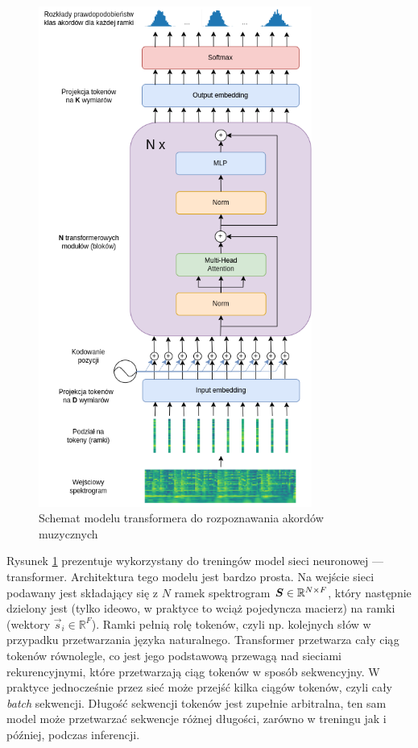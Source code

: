 \begin{figure}
    \centering
    \includegraphics[width=0.8\textwidth]{./images/transformer.png}
    \caption{Schemat modelu transformera do rozpoznawania akordów muzycznych}
    \label{fig:transformer}
\end{figure}

Rysunek \ref{fig:transformer} prezentuje wykorzystany do treningów model sieci neuronowej ---
transformer. Architektura tego modelu jest bardzo prosta. Na wejście sieci podawany jest składający
się z $N$ ramek spektrogram $\boldsymbol{S} \in \mathbb{R}^{N \times F}$, który następnie dzielony jest (tylko ideowo, w
praktyce to wciąż pojedyncza macierz) na ramki (wektory $\vec s_i \in \mathbb{R}^F$). Ramki pełnią
rolę tokenów, czyli np. kolejnych słów w przypadku przetwarzania języka naturalnego. Transformer
przetwarza cały ciąg tokenów równolegle, co jest jego podstawową przewagą nad sieciami
rekurencyjnymi, które przetwarzają ciąg tokenów w sposób sekwencyjny. W praktyce jednocześnie przez
sieć może przejść kilka ciągów tokenów, czyli cały \emph{batch} sekwencji. Długość sekwencji tokenów
jest zupełnie arbitralna, ten sam model może przetwarzać sekwencje różnej długości, zarówno w
treningu jak i później, podczas inferencji.

